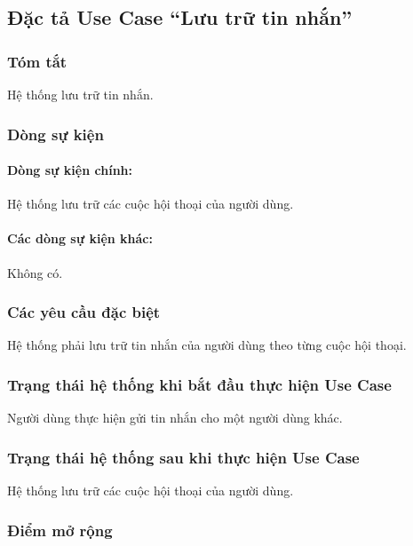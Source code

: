 \subsection{Đặc tả Use Case ``Lưu trữ tin nhắn''}

\subsubsection{Tóm tắt}
Hệ thống lưu trữ tin nhắn.

\subsubsection{Dòng sự kiện}
\paragraph{\textbf{Dòng sự kiện chính:}}
Hệ thống lưu trữ các cuộc hội thoại của người dùng.

\paragraph{\textbf{Các dòng sự kiện khác:}}
Không có.

\subsubsection{Các yêu cầu đặc biệt}
Hệ thống phải lưu trữ tin nhắn của người dùng theo từng cuộc hội thoại.

\subsubsection{Trạng thái hệ thống khi bắt đầu thực hiện Use Case}
Người dùng thực hiện gửi tin nhắn cho một người dùng khác.

\subsubsection{Trạng thái hệ thống sau khi thực hiện Use Case}
Hệ thống lưu trữ các cuộc hội thoại của người dùng.

\subsubsection{Điểm mở rộng}